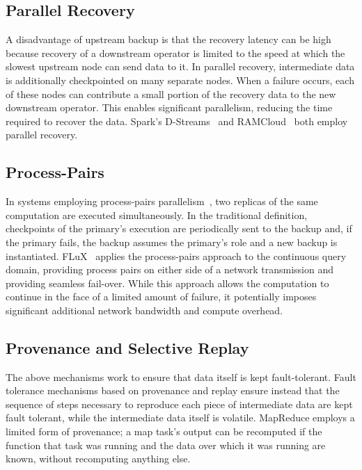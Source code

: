 \subsection{Parallel Recovery}

A disadvantage of upstream backup is that the
recovery latency can be high because recovery of a downstream operator is
limited to the speed at which the slowest upstream node can send data to it.
In parallel recovery, intermediate data is additionally checkpointed on many
separate nodes.  When a failure occurs, each of these nodes can contribute a
small portion of the recovery data to the new downstream operator.  This
enables significant parallelism, reducing the time required to recover the
data. Spark's D-Streams~\cite{dstreams} and RAMCloud~\cite{ramcloud-ft} both
employ parallel recovery.

\subsection{Process-Pairs}

In systems employing process-pairs
parallelism~\cite{gray-reuter}, two replicas of the same computation are
executed simultaneously. In the traditional definition, checkpoints of the
primary's execution are periodically sent to the backup and, if the primary
fails, the backup assumes the primary's role and a new backup is
instantiated. FLuX~\cite{flux} applies the process-pairs approach to the
continuous query domain, providing process pairs on either side of a network
transmission and providing seamless fail-over. While this approach allows the
computation to continue in the face of a limited amount of failure, it
potentially imposes significant additional network bandwidth and compute
overhead.

\subsection{Provenance and Selective Replay}

The above mechanisms work to
ensure that data itself is kept fault-tolerant. Fault tolerance mechanisms
based on provenance and replay ensure instead that the sequence of steps
necessary to reproduce each piece of intermediate data are kept fault tolerant,
while the intermediate data itself is volatile. MapReduce employs a limited
form of provenance; a map task's output can be recomputed if the function that
task was running and the data over which it was running are known, without
recomputing anything else.

